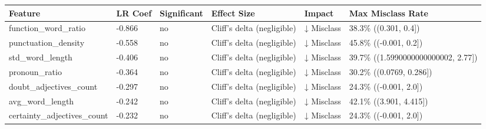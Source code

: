 \begin{tabular}{llllll}
\toprule
Feature & LR Coef & Significant & Effect Size & Impact & Max Misclass Rate \\
\midrule
function\_word\_ratio & -0.866 & no & Cliff's delta (negligible) & ↓ Misclass & 38.3\% ((0.301, 0.4]) \\
punctuation\_density & -0.558 & no & Cliff's delta (negligible) & ↓ Misclass & 45.8\% ((-0.001, 0.2]) \\
std\_word\_length & -0.406 & no & Cliff's delta (negligible) & ↓ Misclass & 39.7\% ((1.5990000000000002, 2.77]) \\
pronoun\_ratio & -0.364 & no & Cliff's delta (negligible) & ↓ Misclass & 30.2\% ((0.0769, 0.286]) \\
doubt\_adjectives\_count & -0.297 & no & Cliff's delta (negligible) & ↓ Misclass & 24.3\% ((-0.001, 2.0]) \\
avg\_word\_length & -0.242 & no & Cliff's delta (negligible) & ↓ Misclass & 42.1\% ((3.901, 4.415]) \\
certainty\_adjectives\_count & -0.232 & no & Cliff's delta (negligible) & ↓ Misclass & 24.3\% ((-0.001, 2.0]) \\
\bottomrule
\end{tabular}
